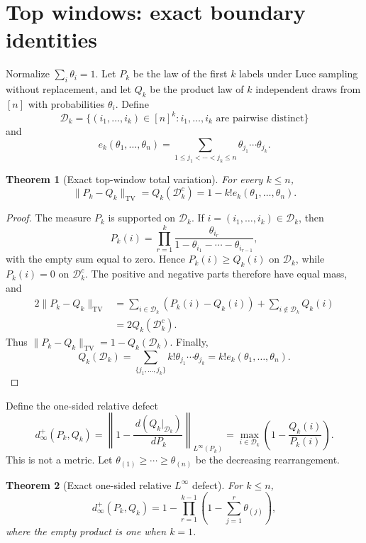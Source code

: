 \documentclass[11pt]{article}
\newtheorem{theorem}{Theorem}[section]
\theoremstyle{remark}
\newcommand{\TV}{\mathrm{TV}}
\newcommand{\dd}{\,d}
\newcommand{\calD}{\mathcal D}
\begin{document}
\section{Top windows: exact boundary identities}

Normalize \(\sum_i\theta_i=1\).  Let \(P_k\) be the law of the first
\(k\) labels under Luce sampling without replacement, and let \(Q_k\) be the
product law of \(k\) independent draws from \([n]\) with probabilities
\(\theta_i\).  Define
\[
 \calD_k=\{(i_1,\ldots,i_k)\in[n]^k:
 i_1,\ldots,i_k\text{ are pairwise distinct}\}
\]
and
\[
 e_k(\theta_1,\ldots,\theta_n)
 =\sum_{1\le j_1<\cdots<j_k\le n}
 \theta_{j_1}\cdots\theta_{j_k}.
\]

\begin{theorem}[Exact top-window total variation]\label{thm:top-tv}
For every \(k\le n\),
\[
        \|P_k-Q_k\|_{\TV}
        =Q_k(\calD_k^c)
        =1-k!e_k(\theta_1,\ldots,\theta_n).
\]
\end{theorem}

\begin{proof}
The measure \(P_k\) is supported on \(\calD_k\).  If \(i=(i_1,\ldots,i_k)\in\calD_k\), then
\[
        P_k(i)=\prod_{r=1}^k
        \frac{\theta_{i_r}}{1-\theta_{i_1}-\cdots-\theta_{i_{r-1}}},
\]
with the empty sum equal to zero.  Hence \(P_k(i)\ge Q_k(i)\) on \(\calD_k\), while \(P_k(i)=0\) on
\(\calD_k^c\).  The positive and negative parts therefore have equal mass, and
\[
\begin{aligned}
2\|P_k-Q_k\|_{\TV}
 &=\sum_{i\in\calD_k}(P_k(i)-Q_k(i))
   +\sum_{i\notin\calD_k}Q_k(i)\\
 &=2Q_k(\calD_k^c).
\end{aligned}
\]
Thus $\|P_k-Q_k\|_{\TV}=1-Q_k(\calD_k)$.
Finally,
\[
        Q_k(\calD_k)=\sum_{\{j_1,\ldots,j_k\}}
        k!\theta_{j_1}\cdots\theta_{j_k}=k!e_k(\theta_1,\ldots,\theta_n).
\]
\end{proof}

Define the one-sided relative defect
\[
 d_\infty^+(P_k,Q_k)
 =\left\|1-\frac{\dd(Q_k|_{\calD_k})}{\dd P_k}
 \right\|_{L^\infty(P_k)}
 =\max_{i\in\calD_k}
 \left(1-\frac{Q_k(i)}{P_k(i)}\right).
\]
This is not a metric.  Let
\(\theta_{(1)}\ge\cdots\ge\theta_{(n)}\) be the decreasing rearrangement.

\begin{theorem}[Exact one-sided relative $L^\infty$ defect]
\label{thm:dinfty}
For \(k\le n\),
\[
        d_\infty^+(P_k,Q_k)
        =1-\prod_{r=1}^{k-1}
        \left(1-\sum_{j=1}^r\theta_{(j)}\right),
\]
where the empty product is one when $k=1$.
\end{theorem}
\end{document}
